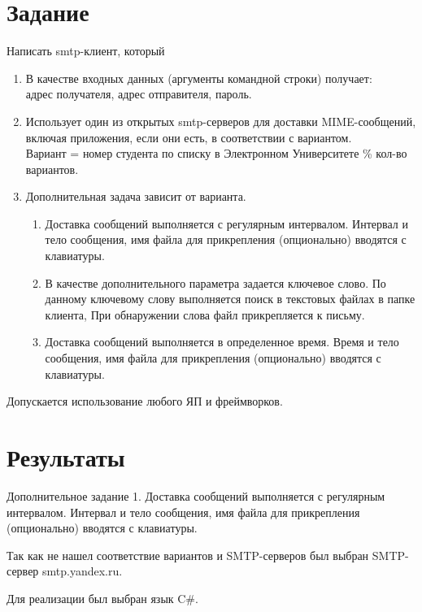 \documentclass[12pt, a4paper]{extarticle}
\begin{document}

\section{Задание}

Написать smtp-клиент, который

\begin{enumerate}
\item В качестве входных данных (аргументы командной строки) получает: \\
    адрес получателя, адрес отправителя, пароль.
	\item 
Использует один из открытых smtp-серверов для доставки MIME-сообщений, включая приложения, если они есть, в соответствии с вариантом. \\
Вариант = номер студента по списку в Электронном Университете \% кол-во вариантов.
	\item Дополнительная задача зависит от варианта.

 	\begin{enumerate}
	\item Доставка сообщений выполняется с регулярным интервалом. Интервал и тело сообщения, имя файла для прикрепления (опционально) вводятся с клавиатуры. 
	\item  В качестве дополнительного параметра задается ключевое слово. По данному ключевому слову выполняется поиск в текстовых файлах в папке клиента, При обнаружении слова файл прикрепляется к письму.

	\item Доставка сообщений выполняется в определенное время. Время и тело сообщения, имя файла для прикрепления (опционально) вводятся с клавиатуры. 
	\end{enumerate}
\end{enumerate}
Допускается использование любого ЯП и фреймворков.

\section{Результаты}
Дополнительное задание 1. Доставка сообщений выполняется с регулярным интервалом. Интервал и тело сообщения, имя файла для прикрепления (опционально) вводятся с клавиатуры. 


Так как не нашел соответствие вариантов и SMTP-серверов был выбран SMTP-сервер smtp.yandex.ru.

Для реализации был выбран язык C\#.
\end{document}
